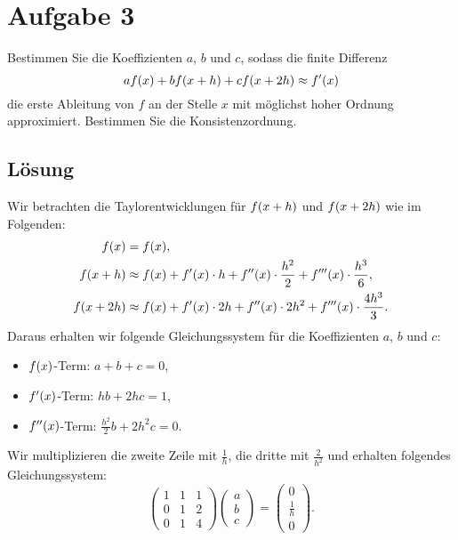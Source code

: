 \documentclass{exercise}
\begin{document}
    \section*{Aufgabe 3}
    
    \begin{problem}
        Bestimmen Sie die Koeffizienten \(a\), \(b\) und \(c\), sodass die finite Differenz
        \[
            af\parentheses*{x} + bf\parentheses*{x + h} + cf\parentheses*{x + 2h} \approx f'\parentheses*{x}
        \]
        die erste Ableitung von \(f\) an der Stelle \(x\) mit möglichst hoher Ordnung approximiert.
        Bestimmen Sie die Konsistenzordnung.
    \end{problem}
    
    \subsection*{Lösung}
    Wir betrachten die Taylorentwicklungen für \(f\parentheses*{x + h}\) und \(f\parentheses*{x + 2h}\) wie im Folgenden:
    \begin{align*}
        f\parentheses*{x} &= f\parentheses*{x},\\
        f\parentheses*{x + h} &\approx f\parentheses*{x} + f'\parentheses*{x} \cdot h + f''\parentheses*{x} \cdot \frac{h^2}{2} + f'''\parentheses*{x} \cdot \frac{h^3}{6},\\
        f\parentheses*{x + 2h} &\approx f\parentheses*{x} + f'\parentheses*{x} \cdot 2h + f''\parentheses*{x} \cdot 2h^2 + f'''\parentheses*{x} \cdot \frac{4h^3}{3}.
    \end{align*}
    Daraus erhalten wir folgende Gleichungssystem für die Koeffizienten \(a\), \(b\) und \(c\):
    \begin{itemize}
        \item \(f\parentheses*{x}\)-Term: \(a + b + c = 0\),
        \item \(f'\parentheses*{x}\)-Term: \(hb + 2hc = 1\),
        \item \(f''\parentheses*{x}\)-Term: \(\frac{h^2}{2}b + 2h^2 c = 0\).
    \end{itemize}
    Wir multiplizieren die zweite Zeile mit \(\frac{1}{h}\), die dritte mit \(\frac{2}{h^2}\) und erhalten folgendes Gleichungssystem:
    \[
        \begin{pmatrix}
            1 & 1 & 1\\
            0 & 1 & 2\\
            0 & 1 & 4
        \end{pmatrix}\begin{pmatrix}
            a\\
            b\\
            c
        \end{pmatrix} = \begin{pmatrix}
            0\\
            \frac{1}{h}\\
            0
        \end{pmatrix}.
    \]
\end{document}
